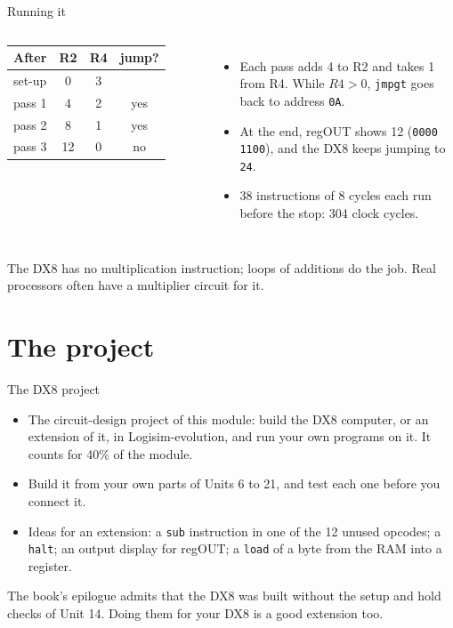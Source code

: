 \documentclass[10pt]{wosm-slides}
\begin{document}
\begin{frame}{Running it}
  \begin{columns}[c, totalwidth=\textwidth]
      \centering
      \begin{tabular}{@{}lccc@{}}
        \toprule
        After & R2 & R4 & jump? \\
        \midrule
        set-up & 0 & 3 & \\
        pass 1 & 4 & 2 & yes \\
        pass 2 & 8 & 1 & yes \\
        pass 3 & 12 & 0 & no \\
        \bottomrule
      \end{tabular}
      \begin{itemize}
        \item Each pass adds 4 to R2 and takes 1 from R4. While $R4 > 0$,
          \texttt{jmpgt} goes back to address \texttt{0A}.
        \item At the end, regOUT shows 12 (\texttt{0000\,1100}), and the DX8 keeps
          jumping to \texttt{24}.
        \item 38 instructions of 8 cycles each run before the stop: 304 clock cycles.
      \end{itemize}
  \end{columns}

  \begin{remark}
    The DX8 has no multiplication instruction; loops of additions do the job. Real
    processors often have a multiplier circuit for it.
  \end{remark}
\end{frame}

\section{The project}

\begin{frame}{The DX8 project}
  \begin{itemize}
    \item The circuit-design project of this module: build the DX8 computer, or an
      extension of it, in Logisim-evolution, and run your own programs on it. It
      counts for 40\% of the module.
    \item Build it from your own parts of Units 6 to 21, and test each one before
      you connect it.
    \item Ideas for an extension: a \texttt{sub} instruction in one of the 12 unused
      opcodes; a \texttt{halt}; an output display for regOUT; a \texttt{load} of a
      byte from the RAM into a register.
  \end{itemize}

  \begin{remark}
    The book's epilogue admits that the DX8 was built without the setup and hold
    checks of Unit 14. Doing them for your DX8 is a good extension too.
  \end{remark}
\end{frame}
\end{document}
